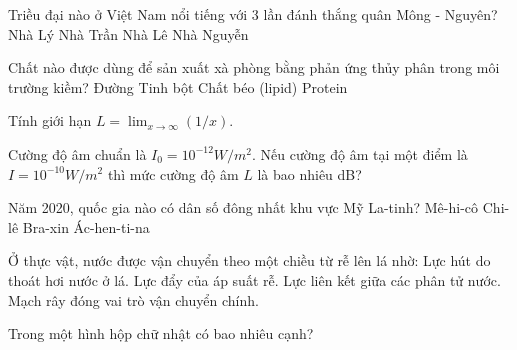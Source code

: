 \begin{ex}
    Triều đại nào ở Việt Nam nổi tiếng với 3 lần đánh thắng quân Mông - Nguyên?
    \choice
    {Nhà Lý}
    {\True Nhà Trần}
    {Nhà Lê}
    {Nhà Nguyễn}
\end{ex}

\begin{ex}
    Chất nào được dùng để sản xuất xà phòng bằng phản ứng thủy phân trong môi trường kiềm?
    \choice
    {Đường}
    {Tinh bột}
    {\True Chất béo (lipid)}
    {Protein}
\end{ex}

\begin{ex}
    Tính giới hạn $L = \lim_{x \to \infty} (1/x)$.
\end{ex}

\begin{ex}
    Cường độ âm chuẩn là $I_0 = 10^{-12} W/m^2$. Nếu cường độ âm tại một điểm là $I = 10^{-10} W/m^2$ thì mức cường độ âm $L$ là bao nhiêu dB?
\end{ex}

\begin{ex}
    Năm 2020, quốc gia nào có dân số đông nhất khu vực Mỹ La-tinh?
    \choice
    {Mê-hi-cô}
    {Chi-lê}
    {\True Bra-xin}
    {Ác-hen-ti-na}
\end{ex}

\begin{ex}
    Ở thực vật, nước được vận chuyển theo một chiều từ rễ lên lá nhờ:
    \choiceTF
    {\True Lực hút do thoát hơi nước ở lá.}
    {\True Lực đẩy của áp suất rễ.}
    {\True Lực liên kết giữa các phân tử nước.}
    {Mạch rây đóng vai trò vận chuyển chính.}
\end{ex}

\begin{ex}
    Trong một hình hộp chữ nhật có bao nhiêu cạnh?
\end{ex}